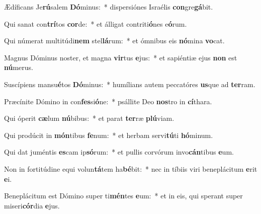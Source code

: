 \item Ædíficans Je\textbf{rú}salem \textbf{Dó}minus:~* dispersiónes Israélis \textbf{con}gre\textbf{gá}bit.
\item Qui sanat con\textbf{trí}tos \textbf{cor}de:~* et álligat contriti\textbf{ó}nes e\textbf{ó}rum.
\item Qui númerat multitúdi\textbf{nem} stel\textbf{lá}rum:~* et ómnibus eis \textbf{nó}mina \textbf{vo}cat.
\item Magnus Dóminus noster, et magna \textbf{vir}tus \textbf{e}jus:~* et sapiéntiæ ejus \textbf{non} est \textbf{nú}merus.
\item Suscípiens mansu\textbf{é}tos \textbf{Dó}minus:~* humílians autem peccatóres \textbf{us}que ad \textbf{ter}ram.
\item Præcínite Dómino in con\textbf{fes}si\textbf{ó}ne:~* psállite Deo \textbf{nos}tro in \textbf{cí}thara.
\item Qui óperit \textbf{cæ}lum \textbf{nú}bibus:~* et parat \textbf{ter}ræ \textbf{plú}viam.
\item Qui prodúcit in \textbf{món}tibus \textbf{fe}num:~* et herbam servi\textbf{tú}ti \textbf{hó}minum.
\item Qui dat juméntis \textbf{es}cam ip\textbf{só}rum:~* et pullis corvórum invo\textbf{cán}tibus \textbf{e}um.
\item Non in fortitúdine equi volun\textbf{tá}tem ha\textbf{bé}bit:~* nec in tíbiis viri beneplácitum \textbf{e}rit \textbf{e}i.
\item Beneplácitum est Dómino super ti\textbf{mén}tes \textbf{e}um:~* et in eis, qui sperant super miseri\textbf{cór}dia \textbf{e}jus.
